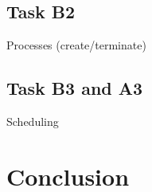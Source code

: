 \documentclass[10pt,a4paper]{report}
\begin{document}
\section{Task B2}
Processes (create/terminate)

\section{Task B3 and A3}
Scheduling

\chapter{Conclusion}
\end{document}
